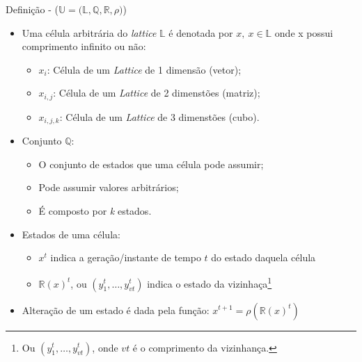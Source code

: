 \documentclass[compress, hide notes]{beamer}
\begin{document}
\begin{frame}{Definição \cite{ufmg} - ($\mathbb{U = (L, Q, R}, \rho)$)}
	\begin{itemize}
 		\setlength\itemsep{12pt}
	
		\item Uma célula arbitrária do \textit{lattice} $\mathbb{L}$ é denotada por $x,\ x \in \mathbb{L}$ onde x possui comprimento infinito ou não:
        \begin{itemize}
			\item $x_{i}$: Célula de um \textit{Lattice} de 1 dimensão (vetor);
            \item $x_{i,j}$: Célula de um \textit{Lattice} de 2 dimenstões (matriz);
            \item $x_{i,j,k}$: Célula de um \textit{Lattice} de 3 dimenstões (cubo).
		\end{itemize}
		
		\item Conjunto $\mathbb{Q}$:
        	\begin{itemize}
              \item O conjunto de estados que uma célula pode assumir;
              \item Pode assumir valores arbitrários;
              \item É composto por \textit{k} estados.
			\end{itemize}
	
    	\item Estados de uma célula:
        \begin{itemize}
          \item $x^t$ indica a geração/instante de tempo $t$ do estado daquela célula

          \item $\mathbb{R}(x)^t$, ou $(y^t_ 1, \ldots, y^t_ {vt})$ indica o estado da vizinhaça\footnote{Ou $(y^t_ 1, \ldots, y^t_ {vt})$, onde $vt$ é o comprimento da vizinhança.}
		\end{itemize}
        
		\item Alteração de um estado é dada pela função: $x^{t+1} = \rho(\mathbb{R}(x)^t)$
		
	\end{itemize}
\end{frame}
\end{document}
